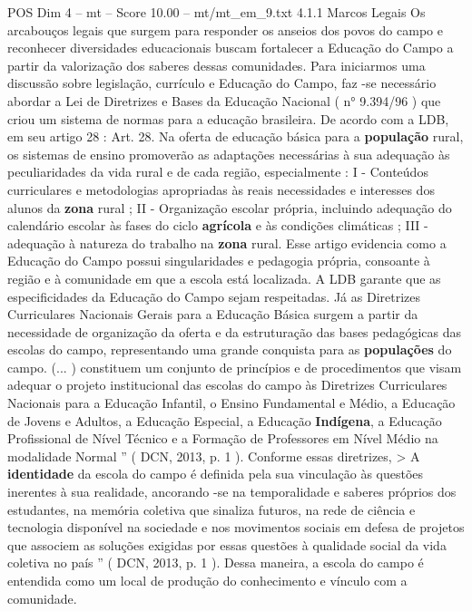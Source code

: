 \begin{textsample}{POS Dim 4 – mt – Score 10.00 – mt/mt\_em\_9.txt}  \label{ex:f4_pos_180}
4.1.1 Marcos Legais Os arcabouços legais que surgem para responder os anseios dos povos do campo e reconhecer diversidades educacionais buscam fortalecer a Educação do Campo a partir da valorização dos saberes dessas comunidades.
Para iniciarmos uma discussão sobre legislação, currículo e Educação do Campo, faz -se necessário abordar a Lei de Diretrizes e Bases da Educação Nacional ( n{\EmojiFont °} 9.394/96 ) que criou um sistema de normas para a educação brasileira.
De acordo com a LDB, em seu artigo 28 : Art. 28.
Na oferta de educação básica para a \textbf{população} rural, os sistemas de ensino promoverão as adaptações necessárias à sua adequação às peculiaridades da vida rural e de cada região, especialmente : I - Conteúdos curriculares e metodologias apropriadas às reais necessidades e interesses dos alunos da \textbf{zona} rural ; II - Organização escolar própria, incluindo adequação do calendário escolar às fases do ciclo \textbf{agrícola} e às condições climáticas ; III - adequação à natureza do trabalho na \textbf{zona} rural.
Esse artigo evidencia como a Educação do Campo possui singularidades e pedagogia própria, consoante à região e à comunidade em que a escola está localizada.
A LDB garante que as especificidades da Educação do Campo sejam respeitadas.
Já as Diretrizes Curriculares Nacionais Gerais para a Educação Básica surgem a partir da necessidade de organização da oferta e da estruturação das bases pedagógicas das escolas do campo, representando uma grande conquista para as \textbf{populações} do campo. (... ) constituem um conjunto de princípios e de procedimentos que visam adequar o projeto institucional das escolas do campo às Diretrizes Curriculares Nacionais para a Educação Infantil, o Ensino Fundamental e Médio, a Educação de Jovens e Adultos, a Educação Especial, a Educação \textbf{Indígena}, a Educação Profissional de Nível Técnico e a Formação de Professores em Nível Médio na modalidade Normal ” ( DCN, 2013, p. 1 ).
Conforme essas diretrizes, > A \textbf{identidade} da escola do campo é definida pela sua vinculação às questões inerentes à sua realidade, ancorando -se na temporalidade e saberes próprios dos estudantes, na memória coletiva que sinaliza futuros, na rede de ciência e tecnologia disponível na sociedade e nos movimentos sociais em defesa de projetos que associem as soluções exigidas por essas questões à qualidade social da vida coletiva no país ” ( DCN, 2013, p. 1 ).
Dessa maneira, a escola do campo é entendida como um local de produção do conhecimento e vínculo com a comunidade.

\end{textsample}
